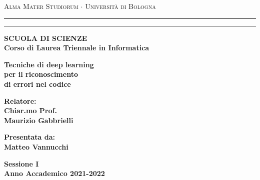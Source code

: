 \begin{titlepage}
\begin{center}
{{\Large{\textsc{Alma Mater Studiorum $\cdot$ Universit\`a di
Bologna}}}} \rule[0.1cm]{15.8cm}{0.1mm}
\rule[0.5cm]{15.8cm}{0.6mm}
{\small{\bf SCUOLA DI SCIENZE\\
Corso di Laurea Triennale in Informatica }}
\end{center}
\vspace{15mm}
\begin{center}
{\LARGE{\bf Tecniche di deep learning}}\\
\vspace{3mm}
{\LARGE{\bf per il riconoscimento}}\\
\vspace{3mm}
{\LARGE{\bf di errori nel codice}}\\
\end{center}
\vspace{40mm}
\par
\noindent
\begin{minipage}[t]{0.47\textwidth}
{\large{\bf Relatore:\\
Chiar.mo Prof.\\
Maurizio Gabbrielli}}
\end{minipage}
\hfill
\begin{minipage}[t]{0.47\textwidth}\raggedleft
{\large{\bf Presentata da:\\
Matteo Vannucchi}}
\end{minipage}
\vspace{20mm}
\begin{center}
{\large{\bf Sessione I\\%
Anno Accademico 2021-2022}}%
\end{center}
\end{titlepage}
